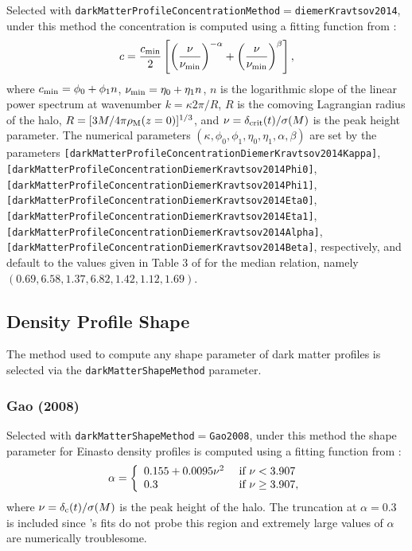 Selected with {\tt darkMatterProfileConcentrationMethod}$=${\tt diemerKravtsov2014}, under this method the concentration is computed using a fitting function from \cite{diemer_universal_2014}:
\begin{equation}
c = {c_{\rm min} \over 2} \left[ \left({\nu\over\nu_{\rm min}}\right)^{-\alpha} + \left({\nu\over\nu_{\rm min}}\right)^{\beta} \right],
\end{equation}
where $c_{\rm min}=\phi_0+\phi_1 n$, $\nu_{\rm min}=\eta_0+\eta_1 n$, $n$ is the logarithmic slope of the linear power spectrum at wavenumber $k = \kappa 2 \pi / R$, $R$ is the comoving Lagrangian radius of the halo, $R=[3 M / 4 \pi \rho_{\rm M}(z=0)]^{1/3}$, and $\nu=\delta_{\rm crit}(t)/\sigma(M)$ is the peak height parameter. The numerical parameters $(\kappa,\phi_0,\phi_1,\eta_0,\eta_1,\alpha,\beta)$ are set by the parameters {\tt [darkMatterProfileConcentrationDiemerKravtsov2014Kappa]},  {\tt [darkMatterProfileConcentrationDiemerKravtsov2014Phi0]},  {\tt [darkMatterProfileConcentrationDiemerKravtsov2014Phi1]},  {\tt [darkMatterProfileConcentrationDiemerKravtsov2014Eta0]},  {\tt [darkMatterProfileConcentrationDiemerKravtsov2014Eta1]},  {\tt [darkMatterProfileConcentrationDiemerKravtsov2014Alpha]},  {\tt [darkMatterProfileConcentrationDiemerKravtsov2014Beta]}, respectively, and default to the values given in Table 3 of \cite{diemer_universal_2014} for the median relation, namely $(0.69,6.58,1.37,6.82,1.42,1.12,1.69)$.

\subsection{Density Profile Shape}\label{sec:DarkMatterProfileShape}

The method used to compute any shape parameter of dark matter profiles is selected via the {\tt darkMatterShapeMethod} parameter.

\subsubsection{Gao (2008)}

Selected with {\tt darkMatterShapeMethod}$=${\tt Gao2008}, under this method the shape parameter for Einasto density profiles is computed using a fitting function from \cite{gao_redshift_2008}:
\begin{equation}
\alpha = \left\{ \begin{array}{ll} 0.155 + 0.0095\nu^2 & \hbox{ if } \nu < 3.907 \\ 0.3 & \hbox{ if } \nu \ge 3.907, \end{array} \right.
\end{equation}
where $\nu=\delta_{\rm c}(t)/\sigma(M)$ is the peak height of the halo. The truncation at $\alpha = 0.3$ is included since \cite{gao_redshift_2008}'s fits do not probe this region and extremely large values of $\alpha$ are numerically troublesome.

